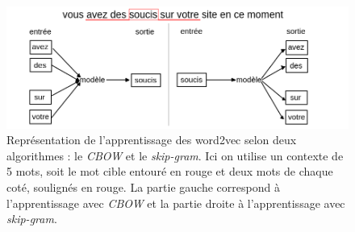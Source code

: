 \begin{figure}[thb]
  \centering
    \includegraphics[width=14cm]{./Chapitre6/figures/cbow_skip.png}
    \caption{Représentation de l'apprentissage des word2vec selon deux algorithmes : le \textit{CBOW} et le \textit{skip-gram}. Ici on utilise un contexte de 5 mots, soit le mot cible entouré en rouge et deux mots de chaque coté, soulignés en rouge. La partie gauche correspond à l'apprentissage avec \textit{CBOW} et la partie droite à l'apprentissage avec \textit{skip-gram}.}
    \label{fig:cbow_skip}
\end{figure}
